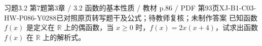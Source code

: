 \par\noindent\begin{minipage}{\linewidth}
\begin{bankitem}{习题3.2 第7题}{第3章 / 3.2 函数的基本性质 / 教材 p.86 / PDF 第93页}{XJ-B1-C03-HW-P086-Y0288}{已对照原页转写题干及公式；待教师复核；未制作答案}
已知函数 $f(x)$ 是定义在 $\mathbb R$ 上的偶函数，当 $x\ge0$ 时，$f(x)=2x(x+4)$，试求出函数 $f(x)$ 在 $\mathbb R$ 上的解析式。
\end{bankitem}
\end{minipage}\par\medskip
